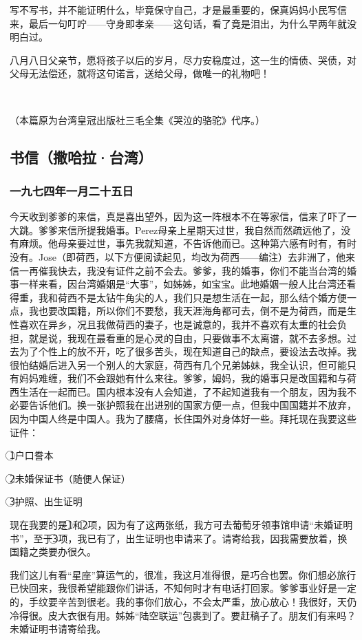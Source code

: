 \par 写不写书，并不能证明什么，毕竟保守自己，才是最重要的，保真妈妈小民写信来，最后一句叮咛——守身即孝亲——这句话，看了竟是泪出，为什么早两年就没明白过。
\par 八月八日父亲节，愿将孩子以后的岁月，尽力安稳度过，这一生的情债、哭债，对父母无法偿还，就将这句诺言，送给父母，做唯一的礼物吧！
\par  
\par （本篇原为台湾皇冠出版社三毛全集《哭泣的骆驼》代序。）

\subsection{书信（撒哈拉·台湾）}


\subsubsection{一九七四年一月二十五日}
\par {}
\par 今天收到爹爹的来信，真是喜出望外，因为这一阵根本不在等家信，信来了吓了一大跳。爹爹来信所提我婚事。Perez母亲上星期天过世，我自然而然疏远他了，没有麻烦。他母亲要过世，事先我就知道，不告诉他而已。这种第六感有时有，有时没有。Jose（即荷西，以下方便阅读起见，均改为荷西——编注）去非洲了，他来信一再催我快去，我没有证件之前不会去。爹爹，我的婚事，你们不能当台湾的婚事一样来看，因台湾婚姻是“大事”，如姊姊，如宝宝。此地婚姻一般人比台湾还看得重，我和荷西不是太钻牛角尖的人，我们只是想生活在一起，那么结个婚方便一点，我也要改国籍，所以你们不要愁，我天涯海角都可去，倒不是为荷西，而是生性喜欢在异乡，况且我做荷西的妻子，也是诚意的，我并不喜欢有太重的社会负担，就是说，我现在最看重的是心灵的自由，只要做事不太离谱，就不去多想。过去为了个性上的放不开，吃了很多苦头，现在知道自己的缺点，要设法去改掉。我很怕结婚后进入另一个别人的大家庭，荷西有几个兄弟姊妹，我全认识，但可能只有妈妈难缠，我们不会跟她有什么来往。爹爹，姆妈，我的婚事只是改国籍和与荷西生活在一起而已。国内根本没有人会知道，了不起知道我有一个朋友，因为我不必要告诉他们。换一张护照我在出进别的国家方便一点，但我中国国籍并不放弃，因为中国人终是中国人。我为了腰痛，长住国外对身体好一些。拜托现在我要这些证件：
\par \textcircled{\small 1}户口誊本
\par \textcircled{\small 2}未婚保证书（随便人保证）
\par \textcircled{\small 3}护照、出生证明
\par 现在我要的是\textcircled{\small 1}和\textcircled{\small 2}项，因为有了这两张纸，我方可去葡萄牙领事馆申请“未婚证明书”，至于\textcircled{\small 3}项，我已有了，出生证明也申请来了。请寄给我，因我需要放着，换国籍之类要办很久。
\par 我们这儿有看“星座”算运气的，很准，我这月准得很，是巧合也罢。你们想必旅行已快回来，我很希望能跟你们讲话，不知何时才有电话打回家。爹爹事业好是一定的，手纹要辛苦到很老。我的事你们放心，不会太严重，放心放心！我很好，天仍冷得很。皮大衣很有用。姊姊“陆空联运”包裹到了。要赶稿子了。朋友们有来吗？未婚证明书请寄给我。
\par {}


